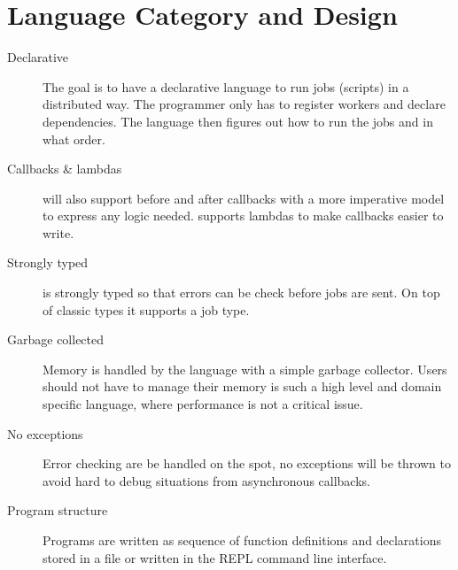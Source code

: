 \section{Language Category and Design}
\label{sect:desg}
\begin{description}
\item[Declarative] The goal is to have a declarative language to run jobs
(scripts) in a distributed way. The programmer only has to register workers and
declare dependencies. The language then figures out how to run the jobs and in
what order.
\item[Callbacks \& lambdas] \lang will also support before and after callbacks
with a more imperative model to express any logic needed. \lang supports
lambdas to make callbacks easier to write.
\item[Strongly typed] \lang is strongly typed so that errors can be check
before jobs are sent. On top of classic types it supports a job type.
\item[Garbage collected] Memory is handled by the language with a simple
garbage collector. Users should not have to manage their memory is such a high
level and domain specific language, where performance is not a critical issue.
\item[No exceptions] Error checking are be handled on the spot, no exceptions
will be thrown to avoid hard to debug situations from asynchronous callbacks.
\item[Program structure] Programs are written as sequence of function
definitions and declarations stored in a file or written in the REPL command line
interface.
\end{description}
